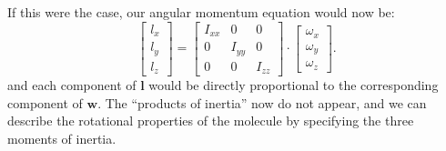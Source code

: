\documentclass[a4paper]{article}
\newcommand{\bvec}[1]{\boldsymbol{\mathbf{#1}}}
\begin{document}
If this were the case, our angular momentum equation would now be:
\begin{equation*}
\begin{bmatrix}l_x\\l_y\\l_z\end{bmatrix} = 
\begin{bmatrix} 
I_{xx} & 0 & 0 \\
0 & I_{yy} & 0 \\
0 & 0 & I_{zz} 
\end{bmatrix}
\cdot
\begin{bmatrix}\omega_x\\\omega_y\\\omega_z\end{bmatrix}.
\end{equation*} 
and each component of $\bvec{l}$ would be directly proportional to the corresponding component of $\bvec{w}$. The ``products of inertia'' now do not appear, and we can describe the rotational properties of the molecule by specifying the three moments of inertia.
\end{document}
